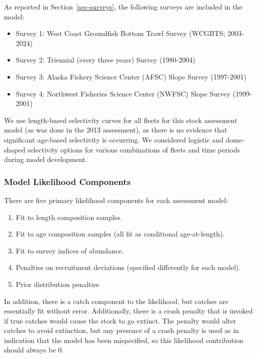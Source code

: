\documentclass[
]{scrartcl}
\providecommand{\tightlist}{%
  \setlength{\itemsep}{0pt}\setlength{\parskip}{0pt}}\usepackage{longtable,booktabs,array}
\begin{document}
As reported in Section~\ref{sec-surveys}, the following surveys are
included in the model:

\begin{itemize}
\tightlist
\item
  Survey 1: West Coast Groundfish Bottom Trawl Survey (WCGBTS;
  2003-2024)
\item
  Survey 2: Triennial (every three years) Survey (1980-2004)\\
\item
  Survey 3: Alaska Fishery Science Center (AFSC) Slope Survey
  (1997-2001)
\item
  Survey 4: Northwest Fisheries Science Center (NWFSC) Slope Survey
  (1999-2001)
\end{itemize}

We use length-based selectivity curves for all fleets for this stock
assessment model (as was done in the 2013 assessment), as there is no
evidence that significant age-based selectivity is occurring. We
considered logistic and dome-shaped selectivity options for various
combinations of fleets and time periods during model development.

\subsubsection{Model Likelihood
Components}\label{model-likelihood-components}

There are five primary likelihood components for each assessment model:

\begin{enumerate}
\def\labelenumi{\arabic{enumi}.}
\tightlist
\item
  Fit to length composition samples.
\item
  Fit to age composition samples (all fit as conditional age-at-length).
\item
  Fit to survey indices of abundance.
\item
  Penalties on recruitment deviations (specified differently for each
  model).
\item
  Prior distribution penalties
\end{enumerate}

In addition, there is a catch component to the likelihood, but catches
are essentially fit without error. Additionally, there is a crash
penalty that is invoked if true catches would cause the stock to go
extinct. The penalty would alter catches to avoid extinction, but any
presence of a crash penalty is used as in indication that the model has
been mispecified, so this likelihood contribution should always be 0.
\end{document}
